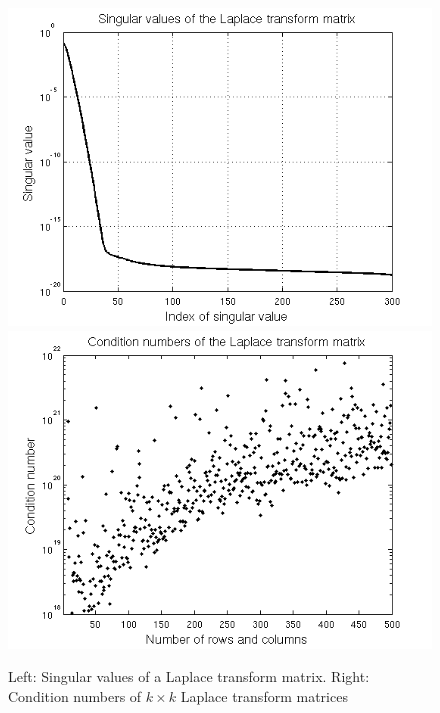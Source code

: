 \documentclass[12pt,a4]{article}
\begin{document}
\begin{figure}[t]
\begin{center}
\includegraphics[scale=.4]{img/singular.png}
\includegraphics[scale=.4]{img/cond.png}
\end{center}
\caption{Left: Singular values of a Laplace transform matrix. Right: Condition numbers of $k \times k$ Laplace transform matrices}
\label{fig:singular}
\end{figure}
\end{document}
